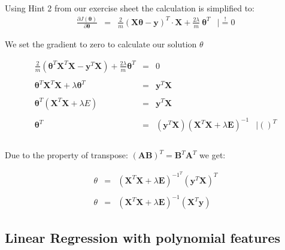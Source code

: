 \documentclass{article}
\begin{document}
\begin{itemize}
      \textrm{Using Hint 2 from our exercise sheet the calculation is simplified to:} \\
    
    $$\begin{array}{rclr}
        \frac{\partial J(\boldsymbol{\theta})}{\partial \boldsymbol{\theta}} & = & \frac{2}{m}(\boldsymbol{X\theta - y})^T \cdot \boldsymbol{X} + \frac{2\lambda}{m}\ \boldsymbol{\theta}^T & \mid \overset{!}{=} 0
    \end{array}$$

    We set the gradient to zero to calculate our solution $\theta$
    
    $$\begin{array}{rclr}    
    \frac{2}{m}(\boldsymbol{\theta}^T \boldsymbol{X}^T \boldsymbol{X} - \boldsymbol{y}^T \boldsymbol{X}) + \frac{2\lambda}{m}\boldsymbol{\theta}^T & = & 0 \\\\
    \boldsymbol{\theta}^T \boldsymbol{X}^T \boldsymbol{X} + \lambda \boldsymbol{\theta}^T & = & \boldsymbol{y}^T \boldsymbol{X} & \\\\
    \boldsymbol{\theta}^T (\boldsymbol{X}^T \boldsymbol{X} + \lambda E) & = & \boldsymbol{y}^T\boldsymbol{X} & \\\\
    \boldsymbol{\theta}^T & = & (\boldsymbol{y}^T \boldsymbol{X})(\boldsymbol{X}^T \boldsymbol{X} + \lambda \boldsymbol{E})^{-1} & \mid ()^T \\\\
    \end{array}$$
	
	Due to the property of transpose: $ (\boldsymbol{A}\boldsymbol{B})^T = \boldsymbol{B}^T\boldsymbol{A}^T $ we get:
	
	$$\begin{array}{rcl}
	
    \theta & = & (\boldsymbol{X}^T\boldsymbol{X} + \lambda\boldsymbol{E})^{-1^T} (\boldsymbol{y}^T\boldsymbol{X})^T \\\\
    \theta & = & (\boldsymbol{X}^T\boldsymbol{X} + \lambda\boldsymbol{E})^{-1} (\boldsymbol{X}^T\boldsymbol{y})
	\end{array}$$
    
\end{itemize}

\newpage

\subsection{Linear Regression with polynomial features}
\end{document}
